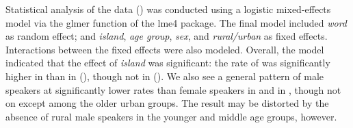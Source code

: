 \documentclass[output=paper,colorlinks,citecolor=brown]{langscibook}
\begin{document}
Statistical analysis of the  data () was conducted using a logistic mixed\hyp effects model via the glmer function of the lme4 package. The final model included \textit{word} as random effect; and \textit{island}, \textit{age group}, \textit{sex}, and \textit{rural/urban} as fixed effects. Interactions between the fixed effects were also modeled. Overall, the model indicated that the effect of \textit{island} was significant: the rate of  was significantly higher in  than in  (), though not in  (). We also see a general pattern of male speakers  at significantly lower rates than female speakers in  and in , though not on  except among the older urban groups. The  result may be distorted by the absence of rural male  speakers in the younger and middle age groups, however. 
\end{document}
